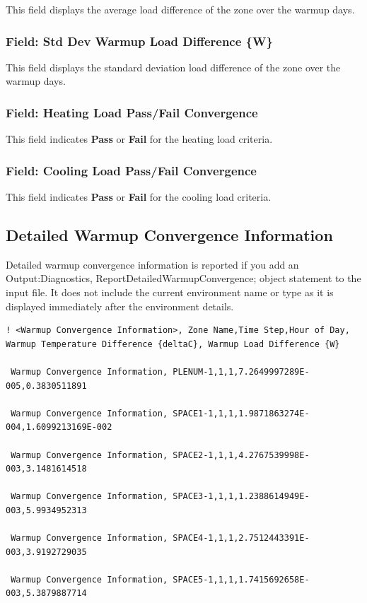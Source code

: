 This field displays the average load difference of the zone over the warmup days.

\subsubsection{Field: Std Dev Warmup Load Difference \{W\}}

This field displays the standard deviation load difference of the zone over the warmup days.

\subsubsection{Field: Heating Load Pass/Fail Convergence}

This field indicates \textbf{Pass} or \textbf{Fail} for the heating load criteria.

\subsubsection{Field: Cooling Load Pass/Fail Convergence}

This field indicates \textbf{Pass} or \textbf{Fail} for the cooling load criteria.

\subsection{Detailed Warmup Convergence Information}

Detailed warmup convergence information is reported if you add an Output:Diagnostics, ReportDetailedWarmupConvergence; object statement to the input file. It does not include the current environment name or type as it is displayed immediately after the environment details.

\begin{lstlisting}
! <Warmup Convergence Information>, Zone Name,Time Step,Hour of Day, Warmup Temperature Difference {deltaC}, Warmup Load Difference {W}

 Warmup Convergence Information, PLENUM-1,1,1,7.2649997289E-005,0.3830511891

 Warmup Convergence Information, SPACE1-1,1,1,1.9871863274E-004,1.6099213169E-002

 Warmup Convergence Information, SPACE2-1,1,1,4.2767539998E-003,3.1481614518

 Warmup Convergence Information, SPACE3-1,1,1,1.2388614949E-003,5.9934952313

 Warmup Convergence Information, SPACE4-1,1,1,2.7512443391E-003,3.9192729035

 Warmup Convergence Information, SPACE5-1,1,1,1.7415692658E-003,5.3879887714
\end{lstlisting}

